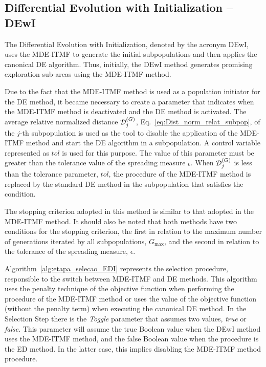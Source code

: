 \documentclass[smallextended]{svjour3}       %
\begin{document}
\subsection{Differential Evolution with Initialization -- DEwI}
\label{sec:DEwI}

The Differential Evolution with Initialization, denoted by the acronym DEwI, uses the MDE-ITMF to generate the initial subpopulations and then applies the canonical DE algorithm. Thus, initially, the DEwI method generates promising exploration sub-areas using the MDE-ITMF method.

Due to the fact that the MDE-ITMF method is used as a population initiator for the DE method, it became necessary to create a parameter that indicates when the MDE-ITMF method is deactivated and the DE method is activated. The average relative normalized distance ${\cal{D}}_{j} ^{(G)}$, Eq.~\ref{eq:Dist_norm_relat_subpop}, of the $j$-th subpopulation is used as the tool to disable the application of the MDE-ITMF method and start the DE algorithm in a subpopulation. A control variable represented as $tol$ is used for this purpose. The value of this parameter must be greater than the tolerance value of the spreading measure $\epsilon$. When $ {\cal{D}}_{j} ^{(G)} $ is less than the tolerance parameter, $ tol $, the procedure of the MDE-ITMF method is replaced by the standard DE method in the subpopulation that satisfies the condition.

The stopping criterion adopted in this method is similar to that adopted in the MDE-ITMF method. It should also be noted that both methods have two conditions for the stopping criterion, the first in relation to the maximum number of generations iterated by all subpopulations, $G_{\text{max}}$, and the second in relation to the tolerance of the spreading measure, $\epsilon$.

Algorithm~\ref{alg:etapa_selecao_EDI} represents the selection procedure, responsible to the switch between MDE-ITMF and DE methods. This algorithm uses the penalty technique of the objective function when performing the procedure of the MDE-ITMF method or uses the value of the objective function (without the penalty term) when executing the canonical DE method. In the Selection Step there is the \emph{Toggle} parameter that assumes two values, \emph{true} or \emph{false}. This parameter will assume the true Boolean value when the DEwI method uses the MDE-ITMF method, and the false Boolean value when the procedure is the ED method. In the latter case, this implies disabling the MDE-ITMF method procedure.
\end{document}
